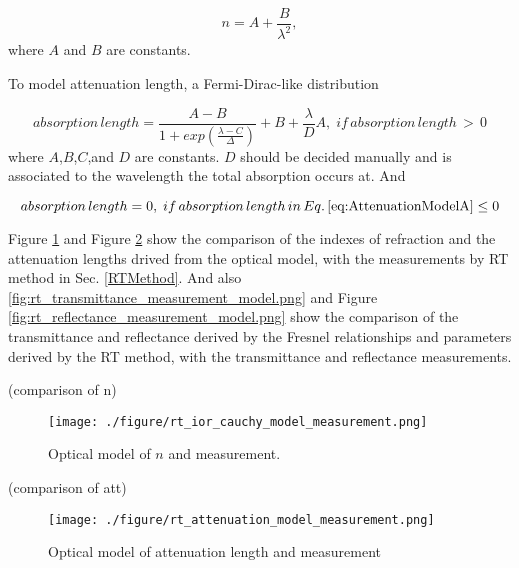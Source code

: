 \begin{equation}
\label{eq:Chauchy}
n = A + \frac{B}{\lambda^2},
\end{equation}
where $A$ and $B$ are constants.


To model attenuation length, a Fermi-Dirac-like distribution


\begin{equation}
\label{eq:AttenuationModelA}
absorption\,length = {\frac{A - B}{1 + exp(\frac{\lambda - C}{\Delta})}} + B + {\frac{\lambda}{D}}A,\;if\,absorption\,length\,>\,0
\end{equation}
where $A$,$B$,$C$,and $D$ are constants. $D$ should be decided manually and is associated to the wavelength the total
absorption occurs at. And


\begin{equation}
\label{eq:AttenuationModelB}
absorption\,length = 0,\;if\,absorption\,length\,in\,Eq.\,\ref{eq:AttenuationModelA}\leq0
\end{equation}


Figure \ref{fig:rt_ior_cauchy_model_measurement.png} and Figure \ref{fig:rt_attenuation_model_measurement.png} show the comparison of the indexes of refraction and the attenuation lengths drived from the
optical model, with the measurements by RT method in Sec. \ref{RTMethod}.
And also \ref{fig:rt_transmittance_measurement_model.png} and Figure \ref{fig:rt_reflectance_measurement_model.png} show the comparison of the transmittance
and reflectance derived by the Fresnel relationships and parameters derived by the RT method, with the transmittance and reflectance measurements.




(comparison of n)
\begin{figure}
    \centering
    \texttt{[image: ./figure/rt\_ior\_cauchy\_model\_measurement.png]}
    \caption[Optical model of $n$ and measurement]{Optical model of $n$ and measurement.}
    \label{fig:rt_ior_cauchy_model_measurement.png}
    \end{figure}



(comparison of att)
\begin{figure}[h]
    \centering
    \texttt{[image: ./figure/rt\_attenuation\_model\_measurement.png]}
    \caption[Optical model of attenuation length and measurement]{Optical model of attenuation length and measurement}
    \label{fig:rt_attenuation_model_measurement.png}
    \end{figure}


